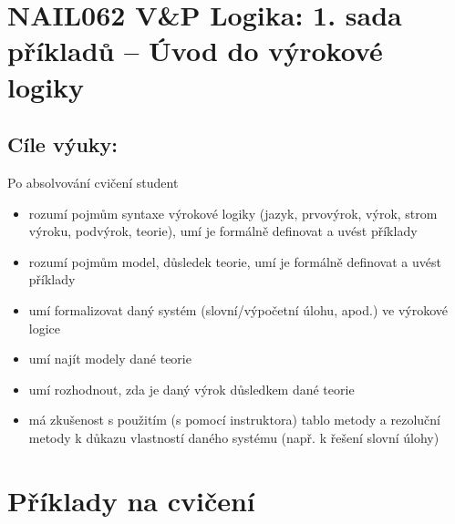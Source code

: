 \section*{NAIL062 V\&P Logika: 1. sada příkladů -- Úvod do výrokové logiky}

\subsection*{Cíle výuky:} Po absolvování cvičení student

    \begin{itemize}\setlength{\itemsep}{0pt}
        \item rozumí pojmům syntaxe výrokové logiky (jazyk, prvovýrok, výrok, strom výroku, podvýrok, teorie), umí je formálně definovat a uvést příklady
        \item rozumí pojmům model, důsledek teorie, umí je formálně definovat a uvést příklady
        \item umí formalizovat daný systém (slovní/výpočetní úlohu, apod.) ve výrokové logice
        \item umí najít modely dané teorie
        \item umí rozhodnout, zda je daný výrok důsledkem dané teorie
        \item má zkušenost s použitím (s pomocí instruktora) tablo metody a rezoluční metody k důkazu vlastností daného systému (např. k řešení slovní úlohy)
    \end{itemize}


\section*{Příklady na cvičení}


